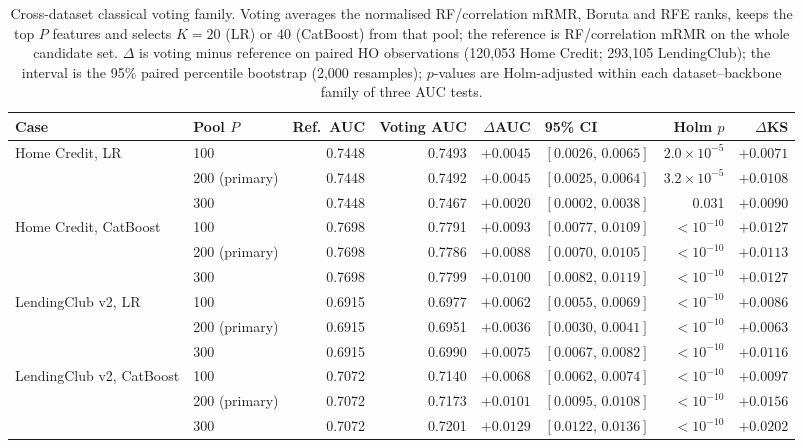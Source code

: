 \documentclass[final,5p,twocolumn]{elsarticle}
\newcommand{\Kfeat}{K}
\begin{document}
\begin{table}[htbp]
\centering
\scriptsize
\setlength{\tabcolsep}{4pt}
\begin{threeparttable}
\caption{Cross-dataset classical voting family. Voting averages the normalised RF/correlation mRMR, Boruta and RFE ranks, keeps the top $P$ features and selects $\Kfeat=20$ (LR) or $40$ (CatBoost) from that pool; the reference is RF/correlation mRMR on the whole candidate set. $\Delta$ is voting minus reference on paired HO observations (120,053 Home Credit; 293,105 LendingClub); the interval is the 95\% paired percentile bootstrap (2,000 resamples); $p$-values are Holm-adjusted within each dataset--backbone family of three AUC tests.}
\label{tab:voting_cross}
\begin{tabular}{@{}llrrrlrr@{}}
\toprule
Case & Pool $P$ & Ref.\ AUC & Voting AUC & $\Delta$AUC & 95\% CI & Holm $p$ & $\Delta$KS \\
\midrule
Home Credit, LR & 100 & 0.7448 & 0.7493 & $+0.0045$ & $[0.0026,\,0.0065]$ & $2.0\times10^{-5}$ & $+0.0071$ \\
 & 200 (primary) & 0.7448 & 0.7492 & $+0.0045$ & $[0.0025,\,0.0064]$ & $3.2\times10^{-5}$ & $+0.0108$ \\
 & 300 & 0.7448 & 0.7467 & $+0.0020$ & $[0.0002,\,0.0038]$ & 0.031 & $+0.0090$ \\
\addlinespace
Home Credit, CatBoost & 100 & 0.7698 & 0.7791 & $+0.0093$ & $[0.0077,\,0.0109]$ & $<10^{-10}$ & $+0.0127$ \\
 & 200 (primary) & 0.7698 & 0.7786 & $+0.0088$ & $[0.0070,\,0.0105]$ & $<10^{-10}$ & $+0.0113$ \\
 & 300 & 0.7698 & 0.7799 & $+0.0100$ & $[0.0082,\,0.0119]$ & $<10^{-10}$ & $+0.0127$ \\
\addlinespace
LendingClub v2, LR & 100 & 0.6915 & 0.6977 & $+0.0062$ & $[0.0055,\,0.0069]$ & $<10^{-10}$ & $+0.0086$ \\
 & 200 (primary) & 0.6915 & 0.6951 & $+0.0036$ & $[0.0030,\,0.0041]$ & $<10^{-10}$ & $+0.0063$ \\
 & 300 & 0.6915 & 0.6990 & $+0.0075$ & $[0.0067,\,0.0082]$ & $<10^{-10}$ & $+0.0116$ \\
\addlinespace
LendingClub v2, CatBoost & 100 & 0.7072 & 0.7140 & $+0.0068$ & $[0.0062,\,0.0074]$ & $<10^{-10}$ & $+0.0097$ \\
 & 200 (primary) & 0.7072 & 0.7173 & $+0.0101$ & $[0.0095,\,0.0108]$ & $<10^{-10}$ & $+0.0156$ \\
 & 300 & 0.7072 & 0.7201 & $+0.0129$ & $[0.0122,\,0.0136]$ & $<10^{-10}$ & $+0.0202$ \\
\bottomrule
\end{tabular}
\end{threeparttable}
\end{table}
\end{document}

